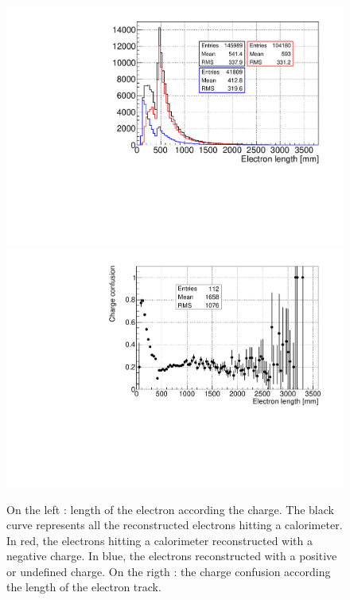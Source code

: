 \documentclass[main.tex]{subfiles}
\begin{document}
\begin{figure}[h!]
\begin{center}
\includegraphics[scale=0.34]{pictures/Chap5/length_tracker_charge_confusion_2.pdf}
\includegraphics[scale=0.34]{pictures/Chap5/charge_confusion_length_tracker.pdf}
\caption{On the left : length of the electron according the charge. The black curve represents all the reconstructed electrons hitting a calorimeter. In red, the electrons hitting a calorimeter reconstructed with a negative charge. In blue, the electrons reconstructed with a positive or undefined charge. On the rigth : the charge confusion according the length of the electron track.}
\label{charge_confusion_tracker_plots}
\end{center}
\end{figure}
\end{document}
